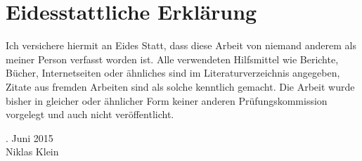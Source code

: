 \section*{Eidesstattliche Erklärung}

Ich versichere hiermit an Eides Statt, dass diese Arbeit von niemand anderem als meiner Person verfasst worden ist.
Alle verwendeten Hilfsmittel wie Berichte, Bücher, Internetseiten oder ähnliches sind im Literaturverzeichnis angegeben,
Zitate aus fremden Arbeiten sind als solche kenntlich gemacht. Die Arbeit wurde bisher in gleicher oder ähnlicher Form
keiner anderen Prüfungskommission vorgelegt und auch nicht veröffentlicht.

\vspace{1cm}

. Juni 2015\\
Niklas Klein